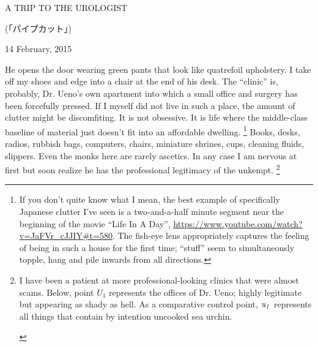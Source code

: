 \documentclass[12pt,a4paper,onecolumn]{letter}
\begin{document}
\begin{center}
A TRIP TO THE UROLOGIST

\begin{CJK}{UTF8}{min}(「パイプカット」)\end{CJK}

14 February, 2015
\end{center}

He opens the door wearing green pants that look like quatrefoil upholstery. I take off my shoes and edge into a chair at the end of his desk. The ``clinic'' is, probably, Dr. Ueno's own apartment into which a small office and surgery has been forcefully pressed. If I myself did not live in such a place, the amount of clutter might be discomfiting. It is not obsessive. It is life where the middle-class baseline of material just doesn't fit into an affordable dwelling.
\footnote{If you don't quite know what I mean, the best example of specifically Japanese clutter I've seen is a two-and-a-half minute segment near the beginning of the movie ``Life In A Day'', \url{https://www.youtube.com/watch?v=JaFVr_cJJIY\#t=580}. The fish-eye lens appropriately captures the feeling of being in such a house for the first time; ``stuff'' seem to simultaneously topple, hang and pile inwards from all directions.}
Books, desks, radios, rubbish bags, computers, chairs, miniature shrines, cups, cleaning fluids, slippers. Even the monks here are rarely ascetics. In any case I am nervous at first but soon realize he has the professional legitimacy of the unkempt.
\footnote{
I have been a patient at more professional-looking clinics that were almost scams. Below, point {\it $U_1$} represents the offices of Dr. Ueno; highly legitimate but appearing as shady as hell. As a comparative control point, ${\it u_1}$ represents all things that contain by intention uncooked sea urchin.
\begin{center}
\end{center}
}
\end{document}
